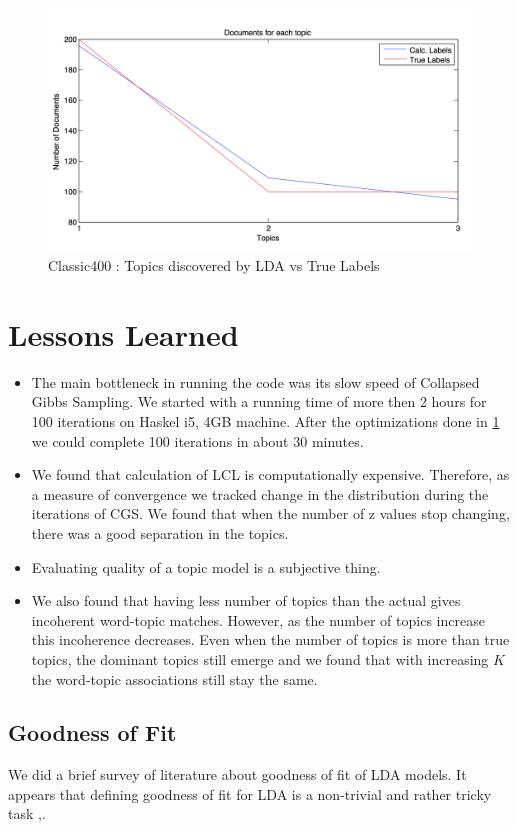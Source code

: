 \documentclass[11pt,a4paper,oneside]{article}
\begin{document}
\begin{figure}[H]
\centering
\includegraphics[width=\columnwidth]{truelabels}
\caption{Classic400 : Topics discovered by LDA vs True Labels}
\label{fig:truelabels}
\end{figure}

\section{Lessons Learned}
\label{Lessons}
\begin{itemize}
\item The main bottleneck in running the code was its slow speed of Collapsed Gibbs Sampling. We started with a running time of more then 2 hours for 100 iterations on Haskel i5, 4GB machine. After the optimizations done in \ref{Lessons} we could complete 100 iterations in about 30 minutes.
\item We found that calculation of LCL is computationally expensive. Therefore, as a measure of convergence we tracked change in the distribution during the iterations of CGS. We found that when the number of z values stop changing, there was a good separation in the topics.
\item Evaluating quality of a topic model is a subjective thing. \cite{chang}
\item We also found that having less number of topics than the actual gives incoherent word-topic matches. However, as the number of topics increase this incoherence decreases. Even when the number of topics is more than true topics, the dominant topics still emerge and we found that with increasing $K$ the word-topic associations still stay the same.
\end{itemize}

\subsection{Goodness of Fit}
We did a brief survey of literature about goodness of fit of LDA models. It appears that defining goodness of fit for LDA is a non-trivial and rather tricky task \cite{heinrich},\cite{nguyen}.
\end{document}

